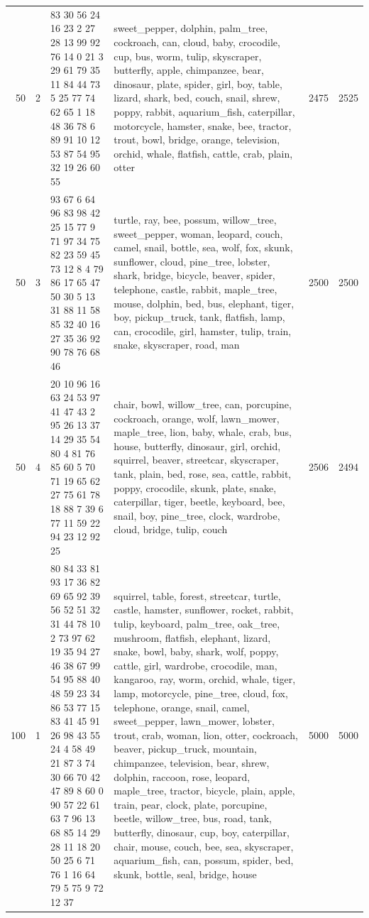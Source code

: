 \begin{tabular}{rrllrr}
50 & 2 & 83 30 56 24 16 23 2 27 28 13 99 92 76 14 0 21 3 29 61 79 35 11 84 44 73 5 25 77 74 62 65 1 18 48 36 78 6 89 91 10 12 53 87 54 95 32 19 26 60 55 & sweet_pepper, dolphin, palm_tree, cockroach, can, cloud, baby, crocodile, cup, bus, worm, tulip, skyscraper, butterfly, apple, chimpanzee, bear, dinosaur, plate, spider, girl, boy, table, lizard, shark, bed, couch, snail, shrew, poppy, rabbit, aquarium_fish, caterpillar, motorcycle, hamster, snake, bee, tractor, trout, bowl, bridge, orange, television, orchid, whale, flatfish, cattle, crab, plain, otter & 2475 & 2525 \\
50 & 3 & 93 67 6 64 96 83 98 42 25 15 77 9 71 97 34 75 82 23 59 45 73 12 8 4 79 86 17 65 47 50 30 5 13 31 88 11 58 85 32 40 16 27 35 36 92 90 78 76 68 46 & turtle, ray, bee, possum, willow_tree, sweet_pepper, woman, leopard, couch, camel, snail, bottle, sea, wolf, fox, skunk, sunflower, cloud, pine_tree, lobster, shark, bridge, bicycle, beaver, spider, telephone, castle, rabbit, maple_tree, mouse, dolphin, bed, bus, elephant, tiger, boy, pickup_truck, tank, flatfish, lamp, can, crocodile, girl, hamster, tulip, train, snake, skyscraper, road, man & 2500 & 2500 \\
50 & 4 & 20 10 96 16 63 24 53 97 41 47 43 2 95 26 13 37 14 29 35 54 80 4 81 76 85 60 5 70 71 19 65 62 27 75 61 78 18 88 7 39 6 77 11 59 22 94 23 12 92 25 & chair, bowl, willow_tree, can, porcupine, cockroach, orange, wolf, lawn_mower, maple_tree, lion, baby, whale, crab, bus, house, butterfly, dinosaur, girl, orchid, squirrel, beaver, streetcar, skyscraper, tank, plain, bed, rose, sea, cattle, rabbit, poppy, crocodile, skunk, plate, snake, caterpillar, tiger, beetle, keyboard, bee, snail, boy, pine_tree, clock, wardrobe, cloud, bridge, tulip, couch & 2506 & 2494 \\
100 & 1 & 80 84 33 81 93 17 36 82 69 65 92 39 56 52 51 32 31 44 78 10 2 73 97 62 19 35 94 27 46 38 67 99 54 95 88 40 48 59 23 34 86 53 77 15 83 41 45 91 26 98 43 55 24 4 58 49 21 87 3 74 30 66 70 42 47 89 8 60 0 90 57 22 61 63 7 96 13 68 85 14 29 28 11 18 20 50 25 6 71 76 1 16 64 79 5 75 9 72 12 37 & squirrel, table, forest, streetcar, turtle, castle, hamster, sunflower, rocket, rabbit, tulip, keyboard, palm_tree, oak_tree, mushroom, flatfish, elephant, lizard, snake, bowl, baby, shark, wolf, poppy, cattle, girl, wardrobe, crocodile, man, kangaroo, ray, worm, orchid, whale, tiger, lamp, motorcycle, pine_tree, cloud, fox, telephone, orange, snail, camel, sweet_pepper, lawn_mower, lobster, trout, crab, woman, lion, otter, cockroach, beaver, pickup_truck, mountain, chimpanzee, television, bear, shrew, dolphin, raccoon, rose, leopard, maple_tree, tractor, bicycle, plain, apple, train, pear, clock, plate, porcupine, beetle, willow_tree, bus, road, tank, butterfly, dinosaur, cup, boy, caterpillar, chair, mouse, couch, bee, sea, skyscraper, aquarium_fish, can, possum, spider, bed, skunk, bottle, seal, bridge, house & 5000 & 5000 \\

\end{tabular}
